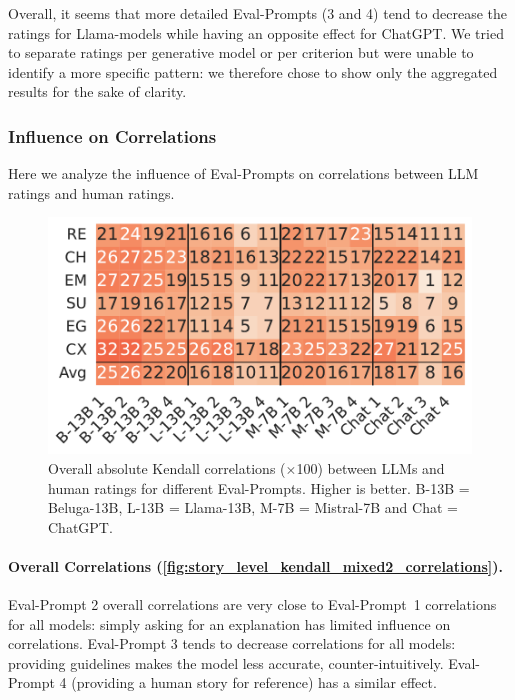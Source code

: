 Overall, it seems that more detailed Eval-Prompts (3 and 4) tend to decrease the ratings for Llama-models while having an opposite effect for ChatGPT. We tried to separate ratings per generative model or per criterion but were unable to identify a more specific pattern: we therefore chose to show only the aggregated results for the sake of clarity.

\subsubsection{Influence on Correlations}
\label{ssub:influence_correlations}
Here we analyze the influence of Eval-Prompts on correlations between LLM ratings and human ratings.

\begin{figure}[!h]
    \centering
    \includegraphics[width=0.8\columnwidth]{pictures/llm_mixed2_story_kendall.pdf}
    \caption{Overall absolute Kendall correlations ($\times$100) between LLMs and human ratings for different Eval-Prompts. Higher is better. B-13B = Beluga-13B, L-13B = Llama-13B, M-7B = Mistral-7B and Chat = ChatGPT.}
    \label{fig:story_level_kendall_mixed2_correlations}
\end{figure}

\paragraph{Overall Correlations (\autoref{fig:story_level_kendall_mixed2_correlations}).}
Eval-Prompt 2 overall correlations are very close to Eval-Prompt~1 correlations for all models: simply asking for an explanation has limited influence on correlations. Eval-Prompt 3 tends to decrease correlations for all models: providing guidelines makes the model less accurate, counter-intuitively. Eval-Prompt 4 (providing a human story for reference) has a similar effect.

